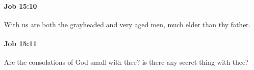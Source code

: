 		\paragraph{Job 15:10} %
			\label{JOB-15-10}

			With us are both the grayheaded and very aged men, much elder than thy father.


		\paragraph{Job 15:11} %
			\label{JOB-15-11}

			Are the consolations of God small with thee? is there any secret thing with thee?


